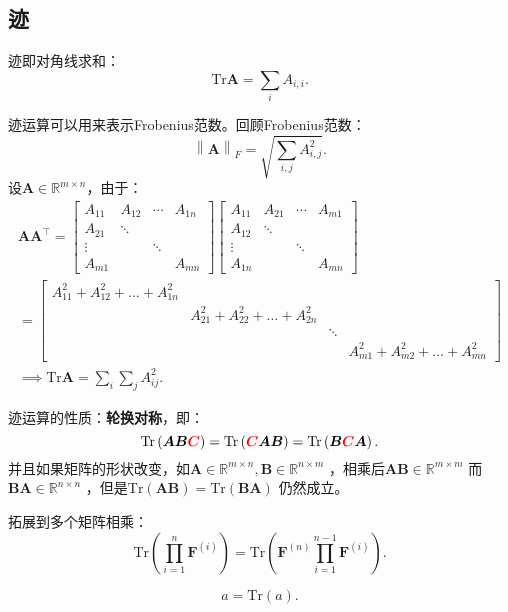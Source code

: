 \subsection{迹}%
\label{sub:迹}
\begin{notation}
迹即对角线求和：\[
    \mathrm{Tr}\bm{A} = \sum_{i}A_{i,i}
.\]
\end{notation}
迹运算可以用来表示Frobenius范数。回顾Frobenius范数：\[
    \left\lVert \bm{A} \right\rVert_{F} = \sqrt{\sum_{i,j}^{} A_{i,j}^2 }
.\]
设$\bm{A}\in \mathbb{R}^{m \times n}$，由于：
\begin{align*}
    \bm{A}\bm{A}^\top = \begin{bmatrix}
        A_{11} & A_{12} & \cdots & A_{1n}\\
        A_{21} & \ddots &   &  \\
        \vdots &  & \ddots & \\
        A_{m1} &  &  & A_{mn}
    \end{bmatrix}\begin{bmatrix}
        A_{11} & A_{21} & \cdots & A_{m1}\\
        A_{12} & \ddots &   &  \\
        \vdots &  & \ddots & \\
        A_{1n} &  &  & A_{mn}
    \end{bmatrix} \\
    = \begin{bmatrix}
        A_{11}^2 +A_{12}^2 +\ldots +A_{1n}^2 & & & \\
         & A_{21}^2 +A_{22}^2 +\ldots +A_{2n}^2 & &  \\
         & & \ddots & \\
         & & & A_{m1}^2 + A_{m2}^2 +\ldots +A_{mn}^2 
    \end{bmatrix}\\
    \implies \mathrm{Tr}\bm{A} = \sum_{i}^{} \sum_{j} A_{ij}^2 
.\end{align*}
\begin{notation}
    迹运算的性质：\textbf{轮换对称}，即：\[
        \mathrm{Tr}\left( \bm{AB\textcolor{red}{C}} \right) = \mathrm{Tr}\left( \bm{\textcolor{red}{C}AB} \right) = \mathrm{Tr}\left( \bm{B\textcolor{red}{C}A} \right)
    .\]
    并且如果矩阵的形状改变，如$\bm{A}\in \mathbb{R}^{m \times n},\bm{B}\in \mathbb{R}^{n \times m}$ ，相乘后$\bm{AB} \in \mathbb{R}^{m \times m}$ 而$\bm{BA} \in \mathbb{R}^{n \times n}$ ，但是$\mathrm{Tr}\left( \bm{AB} \right) = \mathrm{Tr}\left( \bm{BA} \right)$ 仍然成立。

    拓展到多个矩阵相乘：\[
        \mathrm{Tr}\left( \prod_{i=1}^{n} \bm{F}^{(i)} \right) = \mathrm{Tr} \left( \bm{F}^{(n)}\prod_{i=1}^{n-1} \bm{F}^{(i)} \right)
    .\]
\end{notation}
\begin{notation}
    \[
        a = \mathrm{Tr}\left( a \right)
    .\]
\end{notation}
